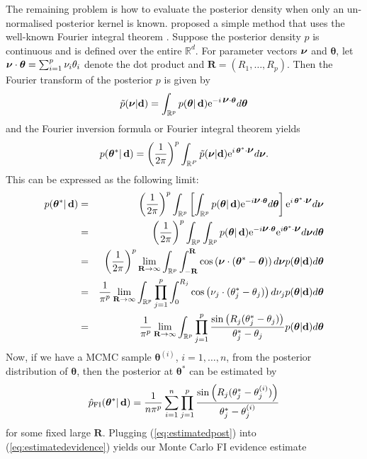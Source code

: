 \documentclass[%
 reprint,
 amsmath,amssymb,
 aps,
]{revtex4-2}
\def\R{\mathbb{R}}
\def\btheta{\boldsymbol{\theta}}
\def\btheta{\boldsymbol{\theta}}
\def\Rbold{\mathbf{R}}
\renewcommand{\d}{{\bf d}}
\newcommand{\btheta}{\mbox{\boldmath $\theta$}}
\newcommand{\bnu}{\mbox{\boldmath $\nu$}}
\newcommand{\e}{{\rm e}}
\begin{document}
The remaining problem is how to evaluate the posterior density when only an un-normalised posterior kernel is known. \cite{rotiroti2022computing} proposed a simple method that uses the well-known  Fourier integral theorem \cite{pristley2005introduction}. Suppose the posterior density $p$ is continuous and is defined over the entire $\R^d$.  For parameter vectors $\bnu$
and $\btheta$, let $\bnu \cdot \btheta=\sum_{i=1}^p \nu_i\theta_i$ denote the dot product and $\Rbold=(R_1,\ldots,R_p)$. Then the Fourier transform of the posterior $p$ is given by
\[
 \tilde{p}(\bnu|\d)=\int_{\R^p} p(\btheta|\,\d) \e^{-i\,\bnu\cdot\btheta} d\btheta
\]
and the Fourier inversion formula or Fourier integral theorem yields
\[p(\btheta^*|\,\d)= \left(\frac{1}{2\pi}\right)^p \int_{\R^P} \tilde{p}(\bnu|\d)\e^{i\,\btheta^*\cdot\bnu} d\bnu.\]
This can be expressed as the following limit:
\begin{eqnarray*}
p(\btheta^*|\,\d) &=& \left(\frac{1}{2\pi}\right)^p   \int_{\R^p} \left[ \int_{\R^p} p(\btheta|\,\d) \e^{-i \bnu \cdot \btheta} d\btheta\right]
 \e^{i\,\btheta^*\cdot\bnu} d\bnu\\
 &=& \left(\frac{1}{2\pi}\right)^p     \int_{\R^p}  \int_{\R^p} p(\btheta|\,\d) \e^{-i \bnu \cdot \btheta}
 \e^{i\btheta^*\cdot\bnu} d\bnu d\btheta\\
 &=& \left(\frac{1}{2\pi}\right)^p    \lim_{\Rbold\rightarrow \infty} \int_{\R^p}  \int_{-\Rbold}^{\Rbold} \cos\left(\bnu\cdot(\btheta^*-\btheta) \right)d\bnu p(\btheta|\d)   d\btheta\\
 &=& \frac{1}{\pi^p}   \lim_{\Rbold\rightarrow \infty} \int_{\R^p}  \prod_{j=1}^p \int_{0}^{R_j} \cos\left(\nu_j\cdot(\theta_j^*-\theta_j) \right)d\nu_j p(\btheta|\d)   d\btheta\\
 &=& \frac{1}{\pi^p}  \lim_{\Rbold\rightarrow \infty} \int_{\R^p}   \prod_{j=1}^p \frac{\sin\left(R_j(\theta_j^*-\theta_j) \right)}{\theta_j^*-\theta_j} p(\btheta|\d)   d\btheta
\end{eqnarray*}
Now, if we have a MCMC sample $\btheta^{(i)}$, $i=1,\ldots,n$, from the posterior distribution of $\btheta$, then the posterior at $\btheta^*$ can be estimated by
\begin{equation}\label{eq:estimatedpost}
\hat{p}_\text{FI}(\btheta^*|\,\d)=\frac{1}{n\pi^p} \sum_{i=1}^n \prod_{j=1}^p\frac{\sin\left(R_j(\theta_j^*-\theta_j^{(i)}) \right)}{\theta_j^*-\theta_j^{(i)}}
\end{equation}
for some fixed large $\Rbold$.
Plugging (\ref{eq:estimatedpost}) into (\ref{eq:estimatedevidence}) yields our Monte Carlo FI evidence estimate
\end{document}
